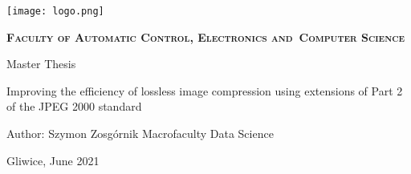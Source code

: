 \newpage
\thispagestyle{empty}
\begin{onehalfspacing}
\begin{center}
	\texttt{[image: logo.png]}
	\vspace{0.8cm}
	
	\fontsize{18}{18} \selectfont
	\textbf{\textsc{Faculty of Automatic Control, Electronics and~Computer Science}}
	\vspace{3.3cm}
	
	\fontsize{18}{18} \selectfont
	Master Thesis

	\vspace{1.7cm}
	
	\fontsize{16}{16} \selectfont
	Improving the efficiency of lossless image compression \linebreak
	using extensions of Part 2 of the JPEG 2000 standard
	\vspace{6cm}
	
	\fontsize{12}{12} \selectfont
	\begin{flushleft}
	Author: Szymon Zosgórnik \linebreak
	Macrofaculty Data Science \linebreak
	\end{flushleft}
	
	\vfill
	\fontsize{12}{12} \selectfont
	Gliwice, June 2021
\end{center}
\end{onehalfspacing}
